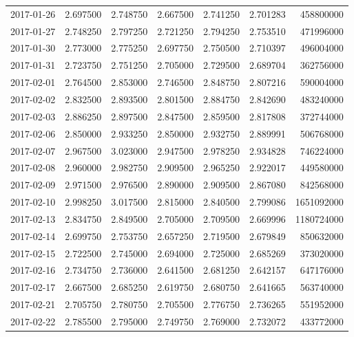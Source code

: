 \begin{tabular}{lrrrrrr}
2017-01-26 &    2.697500 &    2.748750 &    2.667500 &    2.741250 &    2.701283 &   458800000 \\
2017-01-27 &    2.748250 &    2.797250 &    2.721250 &    2.794250 &    2.753510 &   471996000 \\
2017-01-30 &    2.773000 &    2.775250 &    2.697750 &    2.750500 &    2.710397 &   496004000 \\
2017-01-31 &    2.723750 &    2.751250 &    2.705000 &    2.729500 &    2.689704 &   362756000 \\
2017-02-01 &    2.764500 &    2.853000 &    2.746500 &    2.848750 &    2.807216 &   590004000 \\
2017-02-02 &    2.832500 &    2.893500 &    2.801500 &    2.884750 &    2.842690 &   483240000 \\
2017-02-03 &    2.886250 &    2.897500 &    2.847500 &    2.859500 &    2.817808 &   372744000 \\
2017-02-06 &    2.850000 &    2.933250 &    2.850000 &    2.932750 &    2.889991 &   506768000 \\
2017-02-07 &    2.967500 &    3.023000 &    2.947500 &    2.978250 &    2.934828 &   746224000 \\
2017-02-08 &    2.960000 &    2.982750 &    2.909500 &    2.965250 &    2.922017 &   449580000 \\
2017-02-09 &    2.971500 &    2.976500 &    2.890000 &    2.909500 &    2.867080 &   842568000 \\
2017-02-10 &    2.998250 &    3.017500 &    2.815000 &    2.840500 &    2.799086 &  1651092000 \\
2017-02-13 &    2.834750 &    2.849500 &    2.705000 &    2.709500 &    2.669996 &  1180724000 \\
2017-02-14 &    2.699750 &    2.753750 &    2.657250 &    2.719500 &    2.679849 &   850632000 \\
2017-02-15 &    2.722500 &    2.745000 &    2.694000 &    2.725000 &    2.685269 &   373020000 \\
2017-02-16 &    2.734750 &    2.736000 &    2.641500 &    2.681250 &    2.642157 &   647176000 \\
2017-02-17 &    2.667500 &    2.685250 &    2.619750 &    2.680750 &    2.641665 &   563740000 \\
2017-02-21 &    2.705750 &    2.780750 &    2.705500 &    2.776750 &    2.736265 &   551952000 \\
2017-02-22 &    2.785500 &    2.795000 &    2.749750 &    2.769000 &    2.732072 &   433772000 \\

\end{tabular}
